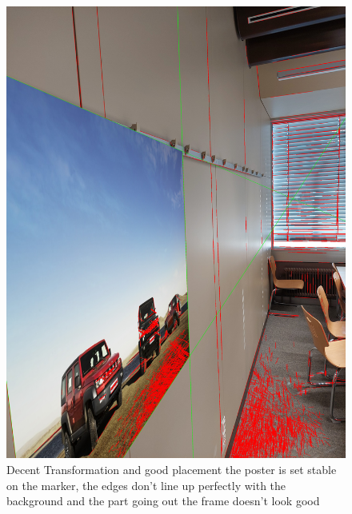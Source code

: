 \documentclass[a4paper,twocolumn]{article}
\begin{document}
    \begin{figure}[htbp]
    \centering
    \includegraphics[width=0.9\columnwidth]{img/20221115_113437.jpg} %
    \caption{Decent Transformation and good placement the poster is set stable on the marker, the edges don't line up perfectly with the background and the part going out the frame doesn't look good}
    \label{fig:20221115_113437.jpg}
    \end{figure}
    
    
    
\end{document}
